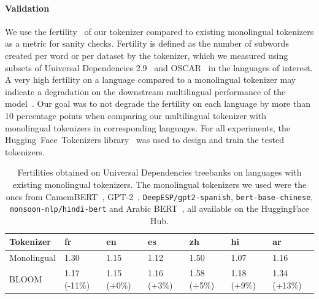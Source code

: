 \documentclass[twoside,11pt]{article}
\begin{document}
\paragraph{Validation}
We use the fertility~\citep{acs2019exploring} of our tokenizer compared to existing monolingual tokenizers as a metric for sanity checks. Fertility is defined as the number of subwords created per word or per dataset by the tokenizer, which we measured using subsets of Universal Dependencies 2.9~\citep{nivre-etal-2017-universal} and OSCAR~\citep{OSCAR} in the languages of interest. A very high fertility on a language compared to a monolingual tokenizer may indicate a degradation on the downstream multilingual performance of the model~\citep{rust-etal-2021-good}. Our goal was to not degrade the fertility on each language by more than 10 percentage points when comparing our multilingual tokenizer with monolingual tokenizers in corresponding languages. For all experiments, the Hugging~Face~Tokenizers library~\citep{hftokenizers2019} was used to design and train the tested tokenizers.

\begin{table}[ht]
\begin{center}
\begin{tabular}{lllllll}
\toprule
\textbf{Tokenizer} & \textbf{fr} & \textbf{en} & \textbf{es} & \textbf{zh} & \textbf{hi} & \textbf{ar} \\ 
\midrule
Monolingual   & 1.30 & 1.15 & 1.12 & 1.50 & 1.07 & 1.16 \\ 
BLOOM         & 1.17 {\scriptsize(-11\%)} & 1.15 {\scriptsize(+0\%)} & 1.16 {\scriptsize(+3\%)} & 1.58 {\scriptsize(+5\%)} & 1.18 {\scriptsize(+9\%)} & 1.34 {\scriptsize(+13\%)} \\ 
\bottomrule
\end{tabular}
\caption{Fertilities obtained on Universal Dependencies treebanks on languages with existing monolingual tokenizers. The monolingual tokenizers we used were the ones from CamemBERT~\citep{martin2020camembert}, GPT-2~\citep{radford2019language}, \texttt{DeepESP/gpt2-spanish}, \texttt{bert-base-chinese}, \texttt{monsoon-nlp/hindi-bert} and Arabic BERT~\citep{safaya2020kuisail}, all available on the HuggingFace Hub.}
\label{table:ud_fertilities}
\end{center}
\end{table}
\end{document}
